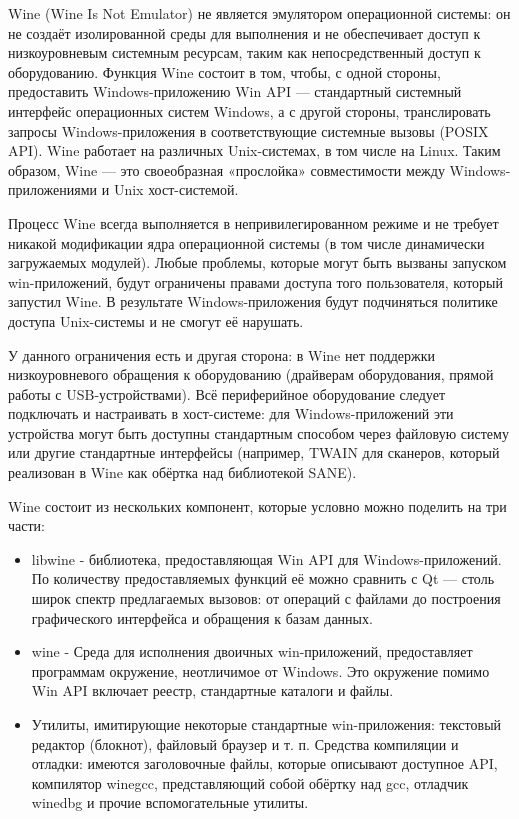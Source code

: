 Wine (Wine Is Not Emulator) не является эмулятором операционной системы: он не создаёт изолированной среды для выполнения и не обеспечивает доступ к низкоуровневым системным ресурсам, таким как непосредственный доступ к оборудованию. Функция Wine состоит в том, чтобы, с одной стороны, предоставить Windows-приложению Win API — стандартный системный интерфейс операционных систем Windows, а с другой стороны, транслировать запросы Windows-приложения в соответствующие системные вызовы (POSIX API). Wine работает на различных Unix-системах, в том числе на Linux. Таким образом, Wine — это своеобразная «прослойка» совместимости между Windows-приложениями и Unix хост-системой.

Процесс Wine всегда выполняется в непривилегированном режиме и не требует никакой модификации ядра операционной системы (в том числе динамически загружаемых модулей). Любые проблемы, которые могут быть вызваны запуском win-приложений, будут ограничены правами доступа того пользователя, который запустил Wine. В результате Windows-приложения будут подчиняться политике доступа Unix-системы и не смогут её нарушать.

У данного ограничения есть и другая сторона: в Wine нет поддержки низкоуровневого обращения к оборудованию (драйверам оборудования, прямой работы с USB-устройствами). Всё периферийное оборудование следует подключать и настраивать в хост-системе: для Windows-приложений эти устройства могут быть доступны стандартным способом через файловую систему или другие стандартные интерфейсы (например, TWAIN для сканеров, который реализован в Wine как обёртка над библиотекой SANE).

Wine состоит из нескольких компонент, которые условно можно поделить на три части:

\begin{itemize}
	\item libwine - библиотека, предоставляющая Win API для Windows-приложений. По количеству предоставляемых функций её можно сравнить с Qt — столь широк спектр предлагаемых вызовов: от операций с файлами до построения графического интерфейса и обращения к базам данных.
	\item wine - Среда для исполнения двоичных win-приложений, предоставляет программам окружение, неотличимое от Windows. Это окружение помимо Win API включает реестр, стандартные каталоги и файлы.
	\item Утилиты, имитирующие некоторые стандартные win-приложения: текстовый редактор (блокнот), файловый браузер и т. п. Средства компиляции и отладки: имеются заголовочные файлы, которые описывают доступное API, компилятор winegcc, представляющий собой обёртку над gcc, отладчик winedbg и прочие вспомогательные утилиты.
\end{itemize}


